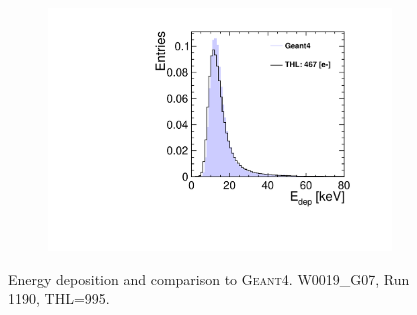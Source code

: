 \begin{figure}[htbp]
\begin{subfigure}[b]{0.32\textwidth}
    \includegraphics[width=\textwidth]{./figures/Calibration/Edep_G4_W0019_G07.pdf}
    \caption{}
  \end{subfigure}
  \caption{Energy deposition and comparison to
    \textsc{Geant4}. W0019\_G07, Run 1190, THL=995.}
  \label{fig:EdepW19L8}
\end{figure}


